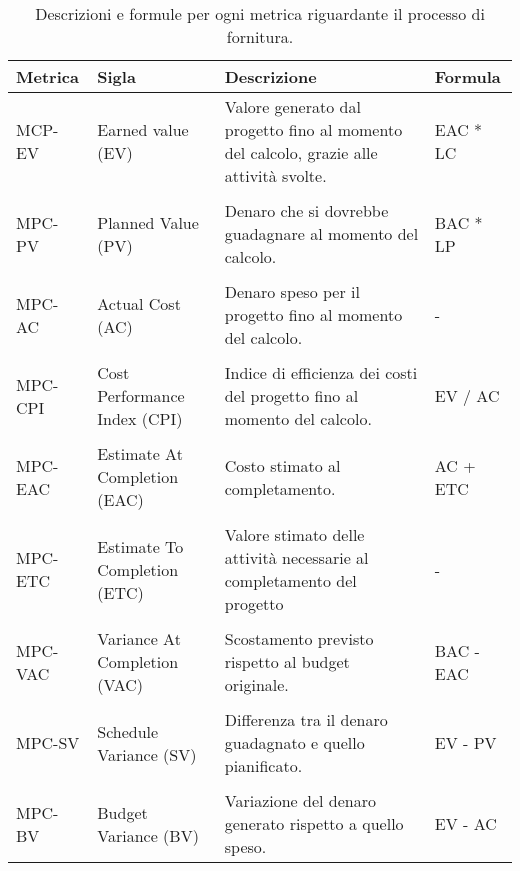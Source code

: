 \begin{table}[h]	
	\centering
	\begin{tabular}{p{2cm} p{4cm} p{7cm} p{2cm}}
		\toprule
		\textbf{Metrica}& \textbf{Sigla} & \textbf{Descrizione} & \textbf{Formula} \\
		\midrule
		MCP-EV & Earned value (EV) & Valore generato dal progetto fino al momento del calcolo, grazie alle attività svolte. & EAC * LC \\\\
		MPC-PV & Planned Value (PV) & Denaro che si dovrebbe guadagnare al momento del calcolo. & BAC * LP \\\\
		MPC-AC & Actual Cost (AC) &  Denaro speso per il progetto fino al momento del calcolo.& - \\\\
		MPC-CPI & Cost Performance Index (CPI) & Indice di efficienza dei costi del progetto fino al momento del calcolo. & EV / AC \\\\
		MPC-EAC & Estimate At Completion (EAC) & Costo stimato al completamento. & AC + ETC \\\\
		MPC-ETC & Estimate To Completion (ETC) & Valore stimato delle attività necessarie al completamento del progetto & - \\\\
		MPC-VAC & Variance At Completion (VAC) & Scostamento previsto rispetto al budget originale. & BAC - EAC \\\\
		MPC-SV & Schedule Variance (SV) & Differenza tra il denaro guadagnato e quello pianificato. & EV - PV \\\\
		MPC-BV & Budget Variance (BV) & Variazione del denaro generato rispetto a quello speso. & EV - AC \\
		\bottomrule
	\end{tabular}
	\caption{Descrizioni e formule per ogni metrica riguardante il processo di fornitura.}
	\label{table:Tabella metriche con formule per il processo di fornitura.}
\end{table}
\clearpage
{}
